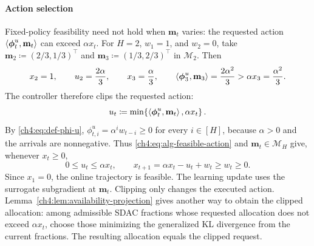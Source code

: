 \paragraph{Action selection}
Fixed-policy feasibility need not hold when $\mathbf{m}_t$ varies: the
requested action $\left\langle \boldsymbol{\phi}_t^u,\mathbf{m}_t \right\rangle$ can exceed
$\alpha x_t$. For $H=2$, $w_1=1$, and $w_2=0$, take
$\mathbf m_2\coloneqq(2/3,1/3)^\top$ and $\mathbf m_3\coloneqq(1/3,2/3)^\top$ in
$\mathcal M_2$. Then
\[
 x_2=1,\qquad u_2=\frac{2\alpha}{3},\qquad x_3=\frac{\alpha}{3},
 \qquad
 \left\langle \boldsymbol\phi_3^u,\mathbf m_3 \right\rangle
 =\frac{2\alpha^2}{3}>\alpha x_3=\frac{\alpha^2}{3}.
\]
The controller therefore clips the requested action:
\begin{equation}
\label{ch4:eq:alg-feasible-action}
u_t
\coloneqq
\min\!\left\{
\left\langle \boldsymbol{\phi}_t^u,\mathbf{m}_t \right\rangle,
\alpha x_t
\right\}.
\end{equation}
By \eqref{ch4:eq:def-phi-u}, $\phi_{t,i}^u=\alpha^i w_{t-i}\ge0$ for every
$i\in[H]$, because $\alpha>0$ and the arrivals are nonnegative. Thus
\eqref{ch4:eq:alg-feasible-action} and $\mathbf m_t\in\mathcal M_H$ give,
whenever $x_t\ge0$,
\[
0\le u_t\le\alpha x_t,
\qquad x_{t+1}=\alpha x_t-u_t+w_t\ge w_t\ge0.
\]
Since $x_1=0$, the online trajectory is feasible. The learning update uses
the surrogate subgradient at $\mathbf m_t$. Clipping only changes the
executed action. Lemma~\ref{ch4:lem:availability-projection} gives another way
to obtain the clipped allocation: among admissible SDAC fractions whose
requested allocation does not exceed $\alpha x_t$, choose those minimizing
the generalized KL divergence from the current fractions. The resulting
allocation equals the clipped request.
